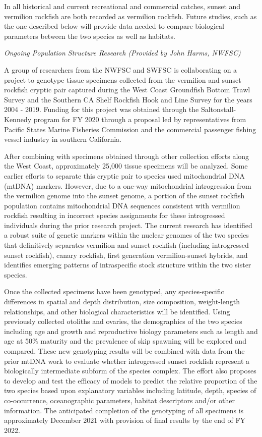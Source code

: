 \documentclass[
  english,
  a4paper,
]{article}
\begin{document}
In all historical and current recreational and commercial catches, sunset and
vermilion rockfish are both recorded as vermilion rockfish. Future studies,
such as the one described below will provide data needed to compare biological
parameters between the two species as well as habitats.

\emph{Ongoing Population Structure Research (Provided by John Harms, NWFSC)}

A group of researchers from the NWFSC and SWFSC is collaborating on a project to
genotype tissue specimens collected from the vermilion and sunset rockfish cryptic
pair captured during the West Coast Groundfish Bottom Trawl Survey and the Southern
CA Shelf Rockfish Hook and Line Survey for the years 2004 - 2019. Funding for this
project was obtained through the Saltonstall-Kennedy program for FY 2020 through a
proposal led by representatives from Pacific States Marine Fisheries Commission and
the commercial passenger fishing vessel industry in southern California.

After combining with specimens obtained through other collection efforts along
the West Coast, approximately 25,000 tissue specimens will be analyzed. Some
earlier efforts to separate this cryptic pair to species used mitochondrial DNA
(mtDNA) markers. However, due to a one-way mitochondrial introgression from
the vermilion genome into the sunset genome, a portion of the sunset rockfish
population contains mitochondrial DNA sequences consistent with vermilion rockfish
resulting in incorrect species assignments for these introgressed individuals
during the prior research project. The current research has identified a robust
suite of genetic markers within the nuclear genomes of the two species that
definitively separates vermilion and sunset rockfish (including introgressed
sunset rockfish), canary rockfish, first generation vermilion-sunset hybrids,
and identifies emerging patterns of intraspecific stock structure within the
two sister species.

Once the collected specimens have been genotyped, any species-specific differences
in spatial and depth distribution, size composition, weight-length relationships,
and other biological characteristics will be identified. Using previously
collected otoliths and ovaries, the demographics of the two species including
age and growth and reproductive biology parameters such as length and age at
50\% maturity and the prevalence of skip spawning will be explored and compared.
These new genotyping results will be combined with data from the prior mtDNA
work to evaluate whether introgressed sunset rockfish represent a biologically
intermediate subform of the species complex. The effort also proposes to develop
and test the efficacy of models to predict the relative proportion of the two
species based upon explanatory variables including latitude, depth, species of
co-occurrence, oceanographic parameters, habitat descriptors and/or other
information. The anticipated completion of the genotyping of all specimens
is approximately December 2021 with provision of final results by the end of FY 2022.
\end{document}
